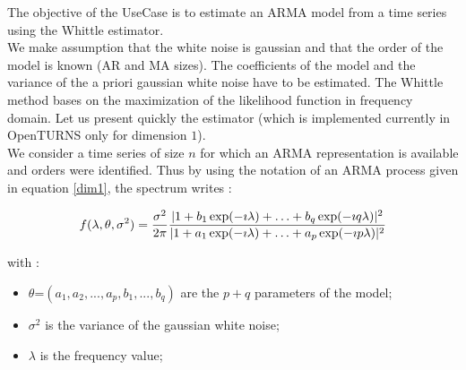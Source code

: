 \renewcommand{\filename}{docUC_StocProc_ARMA_Estimation_Whittle.tex}
\renewcommand{\filetitle}{UC : Estimation of an ARMA model using the Whittle likelihood function}

\HeaderIIILevel

\label{ARMAEstimationWhittle}




The objective of the UseCase is to estimate an ARMA model from a time series using the Whittle estimator. \\
We make assumption that the white noise is gaussian and that the order of the model is known (AR and MA sizes).
The coefficients of the model and the variance of the a priori gaussian white noise have to be estimated. 
The Whittle method bases on the maximization of the likelihood function in frequency domain. 
Let us present quickly the estimator (which is implemented currently in OpenTURNS only for dimension $1$). \\ 

We consider a time series of size $n$ for which an ARMA representation is available and orders were identified.
Thus by using the notation of an ARMA process given in equation \ref{dim1}, the spectrum writes :

\begin{equation}{\label{arma_spectrum}}
f(\lambda, \theta, \sigma^2) = \frac{\sigma^2}{2 \pi} \frac{|1 + b_1 \exp(-\imath \lambda) + \ldots + b_q \exp(-\imath q \lambda)|^2}{|1 + a_1 \exp(-\imath \lambda) + \ldots + a_p \exp(-\imath p \lambda)|^2}
\end{equation}

with :
\begin{itemize}
\item $\theta$=$(a_1, a_2,...,a_p,b_1,...,b_q)$ are the $p+q$ parameters of the model;
\item $\sigma^2$ is the variance of the gaussian white noise;
\item $\lambda$ is the frequency value;
\end{itemize}

